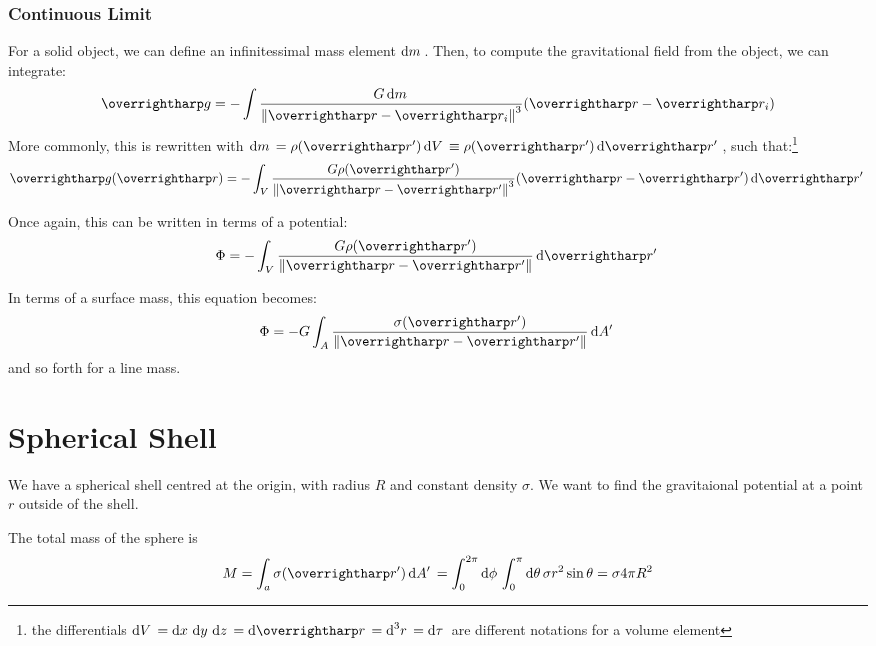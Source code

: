 \subsubsection{Continuous Limit}
For a solid object, we can define an infinitessimal mass element \(\d{m}\). Then, to compute the gravitational field from the object, we can integrate:
\begin{equation*}
	\vv{g}=-\int\frac{G\d{m}}{\norm{\vv{r}-\vv{r}_i}^3}(\vv{r}-\vv{r}_i)
\end{equation*}
More commonly, this is rewritten with \(\d{m}=\rho(\vv{r}')\d{V}\equiv \rho(\vv{r}')\d{\vv{r}'}\), such that:\footnote{the differentials \(\d{V}=\d{x}\d{y}\d{z}=\d{\vv{r}}=\d[3]{r}=\d{\tau}\) are different notations for a volume element}
\begin{equation}
	\vv{g}(\vv{r})=-\int_V \frac{G\rho(\vv{r}')}{\norm{\vv{r}-\vv{r}'}^3}(\vv{r}-\vv{r}')\d{\vv{r}'}
\end{equation}

Once again, this can be written in terms of a potential:
\begin{equation}
	\Phi = -\int_V \frac{G\rho(\vv{r}')}{\norm{\vv{r}-\vv{r}'}}\d{\vv{r}'}
\end{equation}

In terms of a surface mass, this equation becomes:
\[\Phi = -G\int_A \frac{\sigma (\vv{r}')}{\norm{\vv{r}-\vv{r}'}}\d{A'}\]
and so forth for a line mass.

\section{Spherical Shell}
We have a spherical shell centred at the origin, with radius \(R\) and constant density \(\sigma\). We want to find the gravitaional potential at a point \(r\) outside of the shell.	

The total mass of the sphere is
\[M=\int_a \sigma (\vv{r}')\d{A'}=\int_0^{2\pi}\d\phi \int_0^\pi\d\theta \sigma r^2\sin\theta= \sigma 4\pi R^2\]


